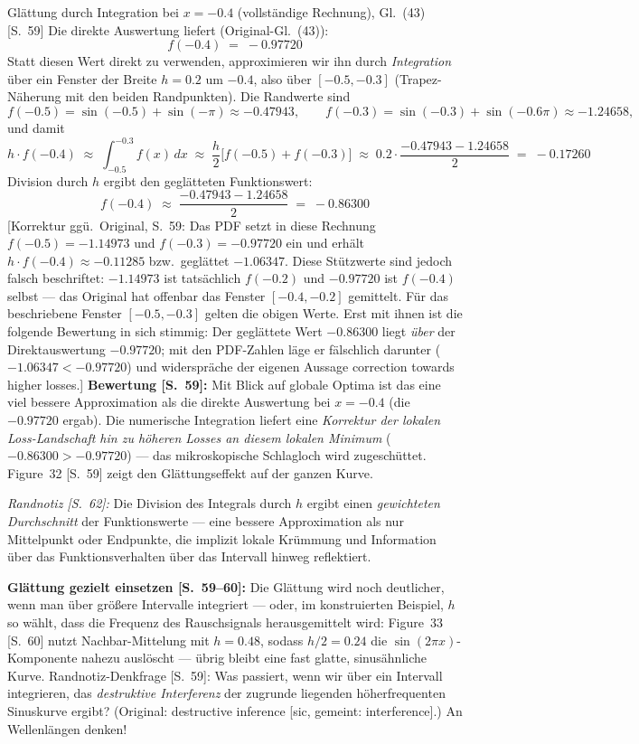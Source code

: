 \begin{bspbox}{Glättung durch Integration bei $x = -0.4$ (vollständige Rechnung), Gl.~(43) [S.~59]}
Die direkte Auswertung liefert (Original-Gl.~(43)):
\[
  f(-0.4) \;=\; -0.97720 \tag{43}
\]
Statt diesen Wert direkt zu verwenden, approximieren wir ihn durch \emph{Integration}
über ein Fenster der Breite $h = 0.2$ um $-0.4$, also über $[-0.5, -0.3]$
(Trapez-Näherung mit den beiden Randpunkten). Die Randwerte sind
\[
  f(-0.5) = \sin(-0.5) + \sin(-\pi) \approx -0.47943, \qquad
  f(-0.3) = \sin(-0.3) + \sin(-0.6\pi) \approx -1.24658,
\]
und damit
\[
  h \cdot f(-0.4) \;\approx\; \int_{-0.5}^{-0.3} f(x)\,dx
  \;\approx\; \frac{h}{2}\bigl[f(-0.5) + f(-0.3)\bigr]
  \;\approx\; 0.2 \cdot \frac{-0.47943 - 1.24658}{2} \;=\; -0.17260
\]
Division durch $h$ ergibt den geglätteten Funktionswert:
\[
  f(-0.4) \;\approx\; \frac{-0.47943 - 1.24658}{2} \;=\; -0.86300
\]
[Korrektur ggü.\ Original, S.~59: Das PDF setzt in diese Rechnung $f(-0.5) = -1.14973$
und $f(-0.3) = -0.97720$ ein und erhält $h \cdot f(-0.4) \approx -0.11285$ bzw.\
geglättet $-1.06347$. Diese Stützwerte sind jedoch falsch beschriftet: $-1.14973$ ist
tatsächlich $f(-0.2)$ und $-0.97720$ ist $f(-0.4)$ selbst --- das Original hat offenbar
das Fenster $[-0.4, -0.2]$ gemittelt. Für das beschriebene Fenster $[-0.5, -0.3]$
gelten die obigen Werte. Erst mit ihnen ist die folgende Bewertung in sich stimmig:
Der geglättete Wert $-0.86300$ liegt \emph{über} der Direktauswertung $-0.97720$; mit
den PDF-Zahlen läge er fälschlich darunter ($-1.06347 < -0.97720$) und widerspräche
der eigenen Aussage \glqq correction towards higher losses\grqq.]
\textbf{Bewertung [S.~59]:} Mit Blick auf globale Optima ist das eine viel bessere
Approximation als die direkte Auswertung bei $x = -0.4$ (die $-0.97720$ ergab). Die
numerische Integration liefert eine \emph{Korrektur der lokalen Loss-Landschaft hin zu
höheren Losses an diesem lokalen Minimum} ($-0.86300 > -0.97720$) --- das
mikroskopische Schlagloch wird zugeschüttet. Figure~32 [S.~59] zeigt den
Glättungseffekt auf der ganzen Kurve.

\medskip
\emph{Randnotiz [S.~62]:} Die Division des Integrals durch $h$ ergibt einen
\emph{gewichteten Durchschnitt} der Funktionswerte --- eine bessere Approximation als
nur Mittelpunkt oder Endpunkte, die implizit lokale Krümmung und Information über das
Funktionsverhalten über das Intervall hinweg reflektiert.

\medskip
\textbf{Glättung gezielt einsetzen [S.~59--60]:} Die Glättung wird noch deutlicher,
wenn man über grö{\ss}ere Intervalle integriert --- oder, im konstruierten Beispiel,
$h$ so wählt, dass die Frequenz des Rauschsignals herausgemittelt wird: Figure~33
[S.~60] nutzt Nachbar-Mittelung mit $h = 0.48$, sodass $h/2 = 0.24$ die
$\sin(2\pi x)$-Komponente nahezu auslöscht --- übrig bleibt eine fast glatte,
sinusähnliche Kurve. Randnotiz-Denkfrage [S.~59]: Was passiert, wenn wir über ein
Intervall integrieren, das \emph{destruktive Interferenz} der zugrunde liegenden
höherfrequenten Sinuskurve ergibt? (Original: \glqq destructive inference\grqq{} [sic,
gemeint: interference].) An Wellenlängen denken!


\end{bspbox}

